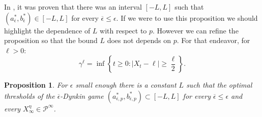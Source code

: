 \documentclass{article}
\newtheorem{proposition}[thm]{Proposition}
\begin{document}
 In \cite[Proposition 6]{MO}, it was proven that there was an interval $[-L,L]$ such that $(a^*_{\overline{\epsilon}},b^{*}_{\overline{\epsilon}}) \in [-L,L]$ for every $\overline{\epsilon} \leq \epsilon$. If we were to use this proposition we should highlight the dependence of $L$ with respect to $p$. However we can refine the proposition so that the bound $L$ does not depends on $p$.
 For that endeavor, for $\ell>0$:
%
\begin{equation*}
\gamma^{\ell}=\inf \left\lbrace t\geq 0\colon  \left\vert X_t-\ell \right\vert \geq \frac{\ell}{2} \right\rbrace.     
\end{equation*}


\begin{proposition}\label{P:BOUNDSABWITHMEANFIELD}
  For $\epsilon$ small enough there is a constant $L$ such that the optimal thresholds of the $\overline{\epsilon} $-Dynkin game  $(a^{\ast}_{\overline{\epsilon},p },b^{\ast }_{\overline{\epsilon},p }) \subset[-L,L]$  for every $\overline{\epsilon}  \leq \epsilon$ and every $X^{\eta}_{\infty} \in \mathcal{P}^{\infty}$. %
\end{proposition}
\end{document}
